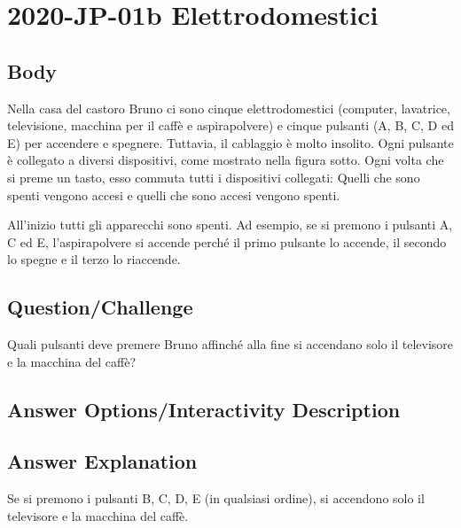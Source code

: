 \documentclass[a4paper,11pt]{report}
\newcommand{\taskGraphicsFolder}{..}
\begin{document}
\section*{\centering{} 2020-JP-01b Elettrodomestici}


\subsection*{Body}

Nella casa del castoro Bruno ci sono cinque elettrodomestici (computer, lavatrice, televisione, macchina per il caffè e aspirapolvere) e cinque pulsanti (A, B, C, D ed E) per accendere e spegnere. Tuttavia, il cablaggio è molto insolito. Ogni pulsante è collegato a diversi dispositivi, come mostrato nella figura sotto. Ogni volta che si preme un tasto, esso commuta tutti i dispositivi collegati: Quelli che sono spenti vengono accesi e quelli che sono accesi vengono spenti.

All’inizio tutti gli apparecchi sono spenti. Ad esempio, se si premono i pulsanti A, C ed E, l’aspirapolvere si accende perché il primo pulsante lo accende, il secondo lo spegne e il terzo lo riaccende.

{\em

\subsection*{Question/Challenge}

Quali pulsanti deve premere Bruno affinché alla fine si accendano solo il televisore e la macchina del caffè?

{\centering%
\par}

}\begingroup
\renewcommand{\arraystretch}{1.5}
\subsection*{Answer Options/Interactivity Description}



\endgroup

\subsection*{Answer Explanation}

Se si premono i pulsanti B, C, D, E (in qualsiasi ordine), si accendono solo il televisore e la macchina del caffè.
\end{document}
